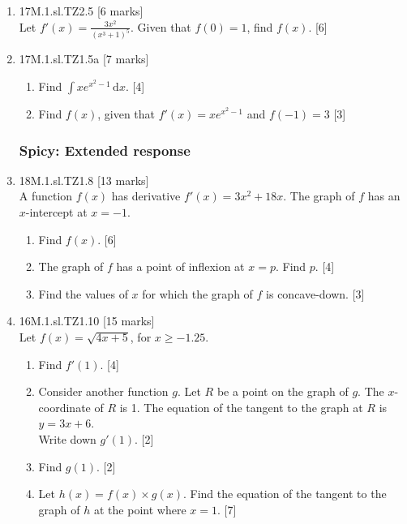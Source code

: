 \documentclass[12pt, twoside]{article}
\begin{document}
\begin{enumerate}
    \item 17M.1.sl.TZ2.5 \hfill [6 marks]\\
    Let $\displaystyle f'(x)=\frac{3x^2}{(x^3+1)^5}$. Given that $f(0)=1$, find $f(x)$. \hfill [6]

    \item 17M.1.sl.TZ1.5a \hfill [7 marks]
    \begin{enumerate}
      \item Find $\int x e^{x^2-1} \,\mathrm{d}x$. \hfill [4]
      \item Find $f(x)$, given that $f'(x) = x e^{x^2-1}$ and $f(-1)=3$ \hfill [3]
    \end{enumerate}

\subsubsection*{Spicy: Extended response}
  \item 18M.1.sl.TZ1.8 \hfill [13 marks]\\
  A function $f(x)$ has derivative $f'(x) = 3x^2 + 18x$. The graph of $f$ has an $x$-intercept at $x = -1$.
  \begin{enumerate}
    \item Find $f(x)$. \hfill [6]
    \item The graph of $f$ has a point of inflexion at $x = p$. Find $p$. \hfill [4]
    \item Find the values of $x$ for which the graph of $f$ is concave-down. \hfill [3]
  \end{enumerate}

  \item 16M.1.sl.TZ1.10 \hfill [15 marks]\\
  Let $f(x)=\sqrt{4x+5}$, for $x \geq -1.25$.
  \begin{enumerate}
    \item Find $f'(1)$. \hfill [4]
    \item Consider another function $g$. Let $R$ be a point on the graph of $g$. The $x$-coordinate of $R$ is 1. The equation of the tangent to the graph at $R$ is  $y=3x+6$.\\
    Write down $g'(1)$. \hfill [2]
    \item Find $g(1)$. \hfill [2]
    \item Let $h(x)=f(x) \times g(x)$. Find the equation of the tangent to the graph of $h$ at the point where $x=1$. \hfill [7]
  \end{enumerate}


\end{enumerate}
\end{document}
